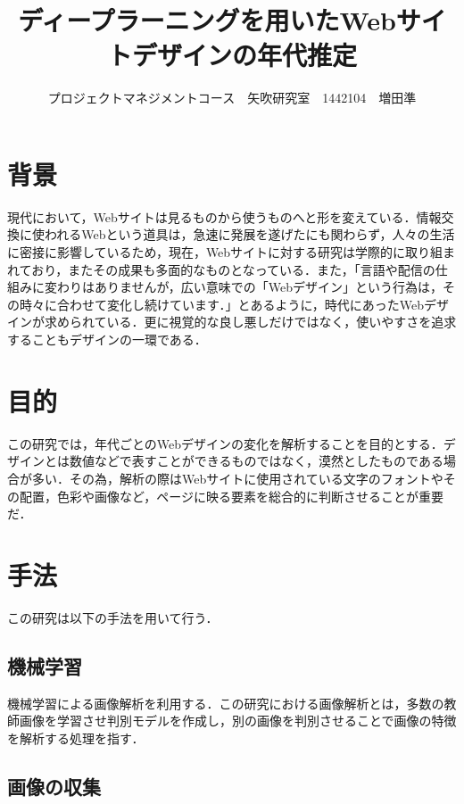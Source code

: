 \documentclass[uplatex,twocolumn,dvipdfmx]{jsarticle}
\title{\vspace{-5mm}\fontsize{14pt}{0pt}\selectfont ディープラーニングを用いたWebサイトデザインの年代推定}
\author{\normalsize プロジェクトマネジメントコース　矢吹研究室　1442104　増田準}
\date{}
\begin{document}
\fontsize{10.5pt}{\baselineskip}\selectfont
\maketitle





\section{背景}

現代において，Webサイトは見るものから使うものへと形を変えている．情報交換に使われるWebという道具は，急速に発展を遂げたにも関わらず，人々の生活に密接に影響しているため，現在，Webサイトに対する研究は学際的に取り組まれており，またその成果も多面的なものとなっている\cite{bib001}．また，「言語や配信の仕組みに変わりはありませんが，広い意味での「Webデザイン」という行為は，その時々に合わせて変化し続けています\cite{bib002}．」とあるように，時代にあったWebデザインが求められている．更に視覚的な良し悪しだけではなく，使いやすさを追求することもデザインの一環である．

\section{目的}

この研究では，年代ごとのWebデザインの変化を解析することを目的とする．デザインとは数値などで表すことができるものではなく，漠然としたものである場合が多い．その為，解析の際はWebサイトに使用されている文字のフォントやその配置，色彩や画像など，ページに映る要素を総合的に判断させることが重要だ．

\section{手法}

この研究は以下の手法を用いて行う．

\subsection{機械学習}

機械学習による画像解析を利用する．この研究における画像解析とは，多数の教師画像を学習させ判別モデルを作成し，別の画像を判別させることで画像の特徴を解析する処理を指す．


\subsection{画像の収集}
\end{document}
